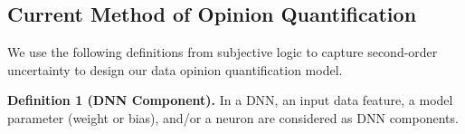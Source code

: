 



\subsection {Current Method of Opinion Quantification}
\label{current_method}
We use the following definitions from subjective logic to capture second-order uncertainty to design our data opinion quantification model. 

 
\vspace{.2cm}
\noindent\textbf{Definition 1 (DNN Component).} In a DNN, an input data feature, a model parameter (weight or bias), and/or a neuron are considered as DNN components.

